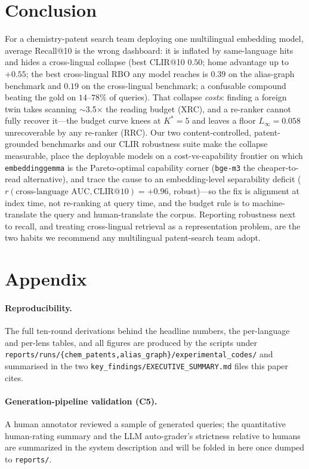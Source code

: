 \documentclass[11pt]{article}
\begin{document}
\section{Conclusion}

For a chemistry-patent search team deploying one multilingual embedding model,
average Recall@10 is the wrong dashboard: it is inflated by same-language hits
and hides a cross-lingual collapse (best CLIR@10 $0.50$; home advantage up to
$+0.55$; the best cross-lingual RBO any model reaches is $0.39$ on the
alias-graph benchmark and $0.19$ on the cross-lingual benchmark; a confusable
compound beating the gold on $14$--$78\%$ of queries). That collapse \emph{costs}:
finding a foreign twin takes scanning $\sim$3.5$\times$ the reading budget (XRC),
and a re-ranker cannot fully recover it---the budget curve knees at $K^{\!*}{=}5$
and leaves a floor $L_\infty=0.058$ unrecoverable by any re-ranker (RRC). Our two
content-controlled, patent-grounded benchmarks and our CLIR robustness suite make
the collapse measurable, place the deployable models on a cost-vs-capability
frontier on which \texttt{embeddinggemma} is the Pareto-optimal capability corner
(\texttt{bge-m3} the cheaper-to-read alternative), and trace the cause to an
embedding-level separability deficit
($r(\text{cross-language AUC},\text{CLIR@10})=+0.96$, robust)---so the fix is
alignment at index time, not re-ranking at query time, and the budget rule is to
machine-translate the query and human-translate the corpus. Reporting robustness
next to recall, and treating cross-lingual retrieval as a representation problem,
are the two habits we recommend any multilingual patent-search team adopt.



\appendix
\section{Appendix}

\paragraph{Reproducibility.}
The full ten-round derivations behind the headline numbers, the per-language and
per-lens tables, and all figures are produced by the scripts under
\texttt{reports/runs/\{chem\_patents,alias\_graph\}/experimental\_codes/} and
summarised in the two \texttt{key\_findings/EXECUTIVE\_SUMMARY.md} files this
paper cites.

\paragraph{Generation-pipeline validation (C5).}
A human annotator reviewed a sample of generated queries; the quantitative
human-rating summary and the LLM auto-grader's strictness relative to humans are
summarized in the system description and will be folded in here once dumped to
\texttt{reports/}.
\end{document}
